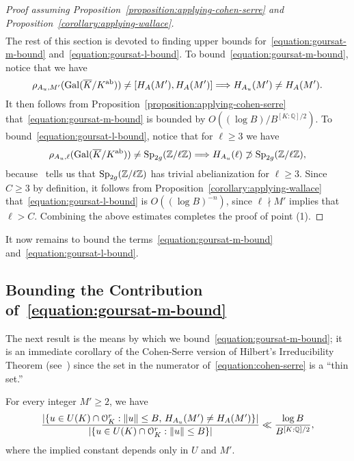 \begin{proof}[Proof assuming Proposition~\ref{proposition:applying-cohen-serre} and Proposition~\ref{corollary:applying-wallace}]
\begin{align}
\end{align}
The rest of this section is devoted to finding upper bounds for~\eqref{equation:goursat-m-bound} and~\eqref{equation:goursat-l-bound}. To bound~\eqref{equation:goursat-m-bound}, notice that we have
$$\rho_{A_u, M'}(\operatorname{Gal}(\overline K/K^{\text{ab}})) \neq [H_A(M'), H_A(M')] \Longrightarrow H_{A_u}(M') \neq H_A(M').$$ It then follows from Proposition~\ref{proposition:applying-cohen-serre} that~\eqref{equation:goursat-m-bound} is bounded by $O( (\log B)/B^{\left[ K:\mathbb Q \right]/2} )$. To bound~\eqref{equation:goursat-l-bound}, notice that for $\ell \geq 3$ we have
$$\rho_{A_u, \ell}(\operatorname{Gal}(\overline{K}/K^{\text{ab}})) \neq \operatorname{Sp}_{2g}({\mathbb Z} / \ell \mathbb Z) \Longrightarrow H_{A_u}(\ell) \not\supset \operatorname{Sp}_{2g}({\mathbb Z} / \ell \mathbb Z) ,$$ because~\cite[Proposition 3(a)]{landesman-swaminathan-tao-xu:lifting-symplectic-group} tells us that $\operatorname{Sp}_{2g}({\mathbb Z} /\ell \mathbb Z)$ has trivial abelianization for $\ell \ge 3$. Since $C \geq 3$ by definition, it follows from Proposition~\ref{corollary:applying-wallace} that~\eqref{equation:goursat-l-bound} is $O(( \log B )^{-n} )$, since $\ell \nmid M'$ implies that $\ell > C$.
Combining the above estimates completes the proof of point (1).
\end{proof}
It now remains to bound the terms~\eqref{equation:goursat-m-bound} and~\eqref{equation:goursat-l-bound}.

\subsection{Bounding the Contribution of~\eqref{equation:goursat-m-bound}} \label{subsection:cohen-serre}

The next result is the means by which we bound~\eqref{equation:goursat-m-bound}; it is an immediate corollary of the Cohen-Serre version of Hilbert's Irreducibility Theorem (see~\cite[Theorem 1.2]{zywina2010hilbert}) since
the set in the numerator of~\eqref{equation:cohen-serre}
is a ``thin set.''


\begin{proposition} \label{proposition:applying-cohen-serre}
		For every integer $M' \ge 2$, we have
		\begin{align}
			\label{equation:cohen-serre}
			\frac{|\{u \in U(K) \cap \mathcal{O}^r_K : \lVert u \rVert \le B,\, H_{A_u}(M') \neq H_A(M') \} |}{ |\{ u\in U(K) \cap \mathcal{O}^r_K: \lVert u \rVert \le B \}| } \ll \frac{ \log B}{B^{[K:{\mathbb Q}]/2}},
		\end{align}
where the implied constant depends only in $U$ and $M'$.
\end{proposition}
	
